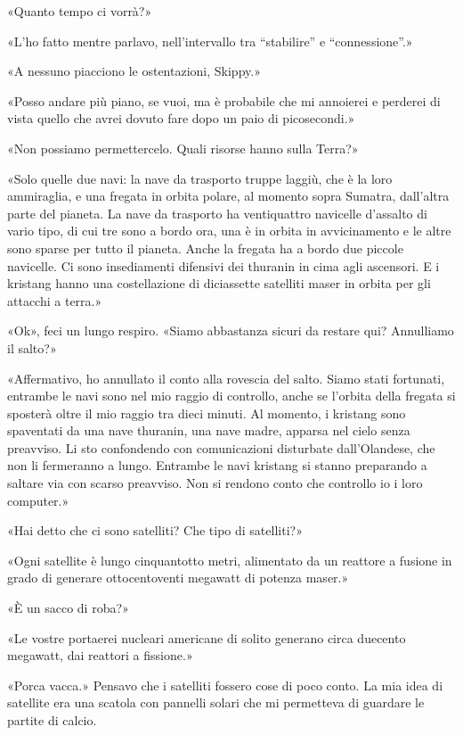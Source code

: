 «Quanto tempo ci vorrà?»

«L'ho fatto mentre parlavo, nell'intervallo tra ``stabilire'' e
``connessione''.»

«A nessuno piacciono le ostentazioni, Skippy.»

«Posso andare più piano, se vuoi, ma è probabile che mi annoierei e
perderei di vista quello che avrei dovuto fare dopo un paio di
picosecondi.»

«Non possiamo permettercelo. Quali risorse hanno sulla Terra?»

«Solo quelle due navi: la nave da trasporto truppe laggiù, che è la loro
ammiraglia, e una fregata in orbita polare, al momento sopra Sumatra,
dall'altra parte del pianeta. La nave da trasporto ha ventiquattro
navicelle d'assalto di vario tipo, di cui tre sono a bordo ora, una è in
orbita in avvicinamento e le altre sono sparse per tutto il pianeta.
Anche la fregata ha a bordo due piccole navicelle. Ci sono insediamenti
difensivi dei thuranin in cima agli ascensori. E i kristang hanno una
costellazione di diciassette satelliti maser in orbita per gli attacchi
a terra.»

«Ok», feci un lungo respiro. «Siamo abbastanza sicuri da restare qui?
Annulliamo il salto?»

«Affermativo, ho annullato il conto alla rovescia del salto. Siamo stati
fortunati, entrambe le navi sono nel mio raggio di controllo, anche se
l'orbita della fregata si sposterà oltre il mio raggio tra dieci minuti.
Al momento, i kristang sono spaventati da una nave thuranin, una nave
madre, apparsa nel cielo senza preavviso. Li sto confondendo con
comunicazioni disturbate dall'Olandese, che non li fermeranno a lungo.
Entrambe le navi kristang si stanno preparando a saltare via con scarso
preavviso. Non si rendono conto che controllo io i loro computer.»

«Hai detto che ci sono satelliti? Che tipo di satelliti?»

«Ogni satellite è lungo cinquantotto metri, alimentato da un reattore a
fusione in grado di generare ottocentoventi megawatt di potenza maser.»

«È un sacco di roba?»

«Le vostre portaerei nucleari americane di solito generano circa
duecento megawatt, dai reattori a fissione.»

«Porca vacca.» Pensavo che i satelliti fossero cose di poco conto. La
mia idea di satellite era una scatola con pannelli solari che mi
permetteva di guardare le partite di calcio.

